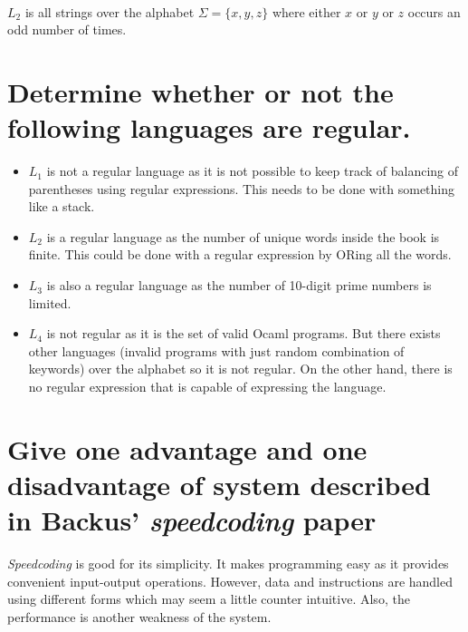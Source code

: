 \documentclass[11pt]{article}
\begin{document}
\begin{center}
 \\
$L_{2}$ is all strings over the alphabet $\Sigma = \{x, y, z\}$ where either $x$ or $y$ or $z$ occurs an odd number of times.
\end{center}

\section{Determine whether or not the following languages are regular.}
\begin{itemize}
\item $L_{1}$ is not a regular language as it is not possible to keep track of balancing of parentheses using regular expressions. This needs to be done with something like a stack.
\item $L_{2}$ is a regular language as the number of unique words inside the book is finite. This could be done with a regular expression by ORing all the words.
\item $L_{3}$ is also a regular language as the number of 10-digit prime numbers is limited. 
\item $L_{4}$ is not regular as it is the set of valid Ocaml programs. But there exists other languages (invalid programs with just random combination of keywords) over the alphabet so it is not regular. On the other hand, there is no regular expression that is capable of expressing the language.
\end{itemize}

\section{Give one advantage and one disadvantage of system described in Backus' \textit{speedcoding} paper}
\textit{Speedcoding} is good for its simplicity. It makes programming easy as it provides convenient input-output operations. However, data and instructions are handled using different forms which may seem a little counter intuitive. Also, the performance is another weakness of the system.
\end{document}
